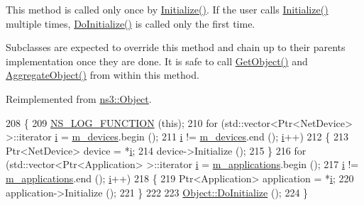This method is called only once by \hyperlink{classns3_1_1Object_af4411cb29971772fcd09203474a95078}{Initialize()}. If the user calls \hyperlink{classns3_1_1Object_af4411cb29971772fcd09203474a95078}{Initialize()} multiple times, \hyperlink{classns3_1_1Node_aad661eab906e49c8b9faee7fd9504fad}{Do\+Initialize()} is called only the first time.

Subclasses are expected to override this method and chain up to their parent\textquotesingle{}s implementation once they are done. It is safe to call \hyperlink{classns3_1_1Object_a13e18c00017096c8381eb651d5bd0783}{Get\+Object()} and \hyperlink{classns3_1_1Object_a79dd435d300f3deca814553f561a2922}{Aggregate\+Object()} from within this method. 

Reimplemented from \hyperlink{classns3_1_1Object_af8482a521433409fb5c7f749398c9dbe}{ns3\+::\+Object}.


\begin{DoxyCode}
208 \{
209   \hyperlink{log-macros-disabled_8h_a90b90d5bad1f39cb1b64923ea94c0761}{NS\_LOG\_FUNCTION} (\textcolor{keyword}{this});
210   \textcolor{keywordflow}{for} (std::vector<Ptr<NetDevice> >::iterator \hyperlink{bernuolliDistribution_8m_a6f6ccfcf58b31cb6412107d9d5281426}{i} = \hyperlink{classns3_1_1Node_af0ba0670e62825e6953317a7a028aa40}{m\_devices}.begin ();
211        \hyperlink{bernuolliDistribution_8m_a6f6ccfcf58b31cb6412107d9d5281426}{i} != \hyperlink{classns3_1_1Node_af0ba0670e62825e6953317a7a028aa40}{m\_devices}.end (); \hyperlink{bernuolliDistribution_8m_a6f6ccfcf58b31cb6412107d9d5281426}{i}++)
212     \{
213       Ptr<NetDevice> device = *\hyperlink{bernuolliDistribution_8m_a6f6ccfcf58b31cb6412107d9d5281426}{i};
214       device->Initialize ();
215     \}
216   \textcolor{keywordflow}{for} (std::vector<Ptr<Application> >::iterator \hyperlink{bernuolliDistribution_8m_a6f6ccfcf58b31cb6412107d9d5281426}{i} = \hyperlink{classns3_1_1Node_a3984bdbc05cc8a6d2eda6c41963f16f6}{m\_applications}.begin ();
217        \hyperlink{bernuolliDistribution_8m_a6f6ccfcf58b31cb6412107d9d5281426}{i} != \hyperlink{classns3_1_1Node_a3984bdbc05cc8a6d2eda6c41963f16f6}{m\_applications}.end (); \hyperlink{bernuolliDistribution_8m_a6f6ccfcf58b31cb6412107d9d5281426}{i}++)
218     \{
219       Ptr<Application> application = *\hyperlink{bernuolliDistribution_8m_a6f6ccfcf58b31cb6412107d9d5281426}{i};
220       application->Initialize ();
221     \}
222 
223   \hyperlink{classns3_1_1Object_af8482a521433409fb5c7f749398c9dbe}{Object::DoInitialize} ();
224 \}
\end{DoxyCode}


